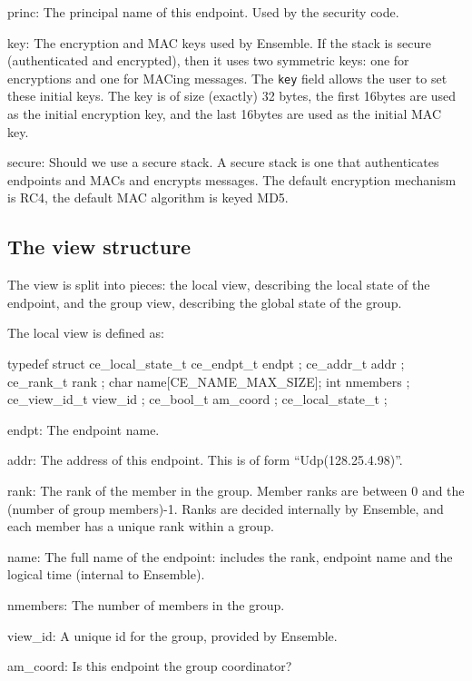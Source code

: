 \begin{description}
\item{princ:} The principal name of this endpoint. Used by the
  security code. 

\item{key:} The encryption and MAC keys used by Ensemble. If the stack
  is secure (authenticated and encrypted), then it uses two symmetric
  keys: one for encryptions and one for MACing messages. The {\tt key}
  field allows the user to set these initial keys. The key is of size
  (exactly) 32 bytes, the first 16bytes are used as the initial encryption
  key, and the last 16bytes are used as the initial MAC key.

\item{secure:} Should we use a secure stack. A secure stack is one
  that authenticates endpoints and MACs and encrypts messages. The
  default encryption mechanism is RC4, the default MAC algorithm is
  keyed MD5. 
\end{description}


\subsection{The view structure}
The view is split into pieces: the local view, describing the local
state of the endpoint, and the group view, describing the global state
of the group. 

The local view is defined as:
\begin{codebox}
typedef struct ce_local_state_t {
    ce_endpt_t endpt ;             
    ce_addr_t addr ;               
    ce_rank_t rank ;               
    char name[CE_NAME_MAX_SIZE];   
    int nmembers ;                 
    ce_view_id_t view_id ;         
    ce_bool_t am_coord ;           
} ce_local_state_t ;

\end{codebox}
\begin{description}
\item{endpt:} The endpoint name.
\item{addr:} The address of this endpoint. This is of form ``Udp(128.25.4.98)''.
\item{rank:} The rank of the member in the group. Member ranks are
  between 0 and the (number of group members)-1. Ranks are
  decided internally by Ensemble, and each member has a unique rank within
  a group. 
\item{name:} The full name of the endpoint: includes the rank,
  endpoint name and the logical time (internal to Ensemble).
\item{nmembers:} The number of members in the group. 
\item{view\_id:} A unique id for the group, provided by Ensemble. 
\item{am\_coord:} Is this endpoint the group coordinator? 
\end{description}

